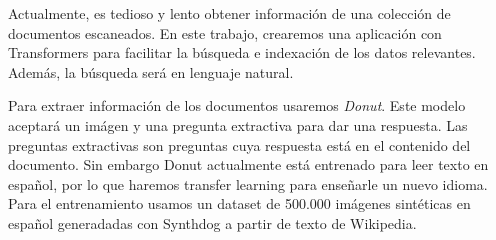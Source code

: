 \documentclass[../main.tex]{subfiles}
\begin{document}



Actualmente, es tedioso y lento obtener información de una colección de documentos escaneados.
En este trabajo, crearemos una aplicación con Transformers para facilitar la búsqueda e indexación de los datos relevantes.
Además, la búsqueda será en lenguaje natural.

Para extraer información de los documentos usaremos \emph{Donut}.
Este modelo aceptará un imágen y una pregunta extractiva para dar una respuesta.
Las preguntas extractivas son preguntas cuya respuesta está en el contenido del documento.
Sin embargo Donut actualmente está entrenado para leer texto en español, por lo que haremos transfer learning para enseñarle un nuevo idioma.
Para el entrenamiento usamos un dataset de 500.000 imágenes sintéticas en español generadadas con Synthdog a partir de texto de Wikipedia.




%
\end{document}
